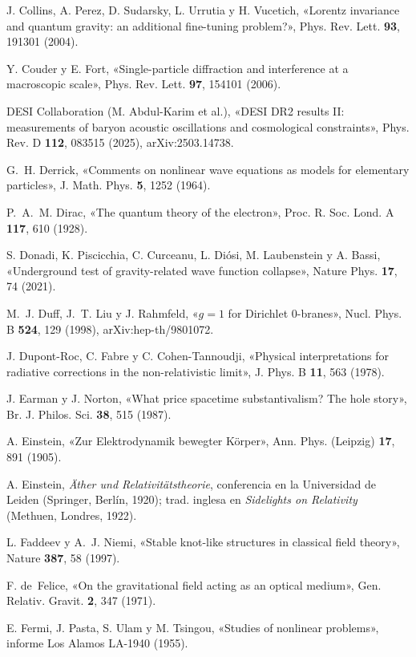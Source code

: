 \documentclass[11pt,a4paper]{article}
\begin{document}
\begin{list}{}{\setlength{\leftmargin}{1.5em}\setlength{\itemindent}{-1.5em}\setlength{\itemsep}{0.15em}\small}
\item J. Collins, A. Perez, D. Sudarsky, L. Urrutia y H. Vucetich, «Lorentz invariance and quantum gravity: an additional fine-tuning problem?», Phys. Rev. Lett. \textbf{93}, 191301 (2004).
\item Y. Couder y E. Fort, «Single-particle diffraction and interference at a macroscopic scale», Phys. Rev. Lett. \textbf{97}, 154101 (2006).
\item DESI Collaboration (M. Abdul-Karim et al.), «DESI DR2 results II: measurements of baryon acoustic oscillations and cosmological constraints», Phys. Rev. D \textbf{112}, 083515 (2025), arXiv:2503.14738.
\item G.~H. Derrick, «Comments on nonlinear wave equations as models for elementary particles», J. Math. Phys. \textbf{5}, 1252 (1964).
\item P.~A.~M. Dirac, «The quantum theory of the electron», Proc. R. Soc. Lond. A \textbf{117}, 610 (1928).
\item S. Donadi, K. Piscicchia, C. Curceanu, L. Diósi, M. Laubenstein y A. Bassi, «Underground test of gravity-related wave function collapse», Nature Phys. \textbf{17}, 74 (2021).
\item M.~J. Duff, J.~T. Liu y J. Rahmfeld, «$g=1$ for Dirichlet 0-branes», Nucl. Phys. B \textbf{524}, 129 (1998), arXiv:hep-th/9801072.
\item J. Dupont-Roc, C. Fabre y C. Cohen-Tannoudji, «Physical interpretations for radiative corrections in the non-relativistic limit», J. Phys. B \textbf{11}, 563 (1978).
\item J. Earman y J. Norton, «What price spacetime substantivalism? The hole story», Br. J. Philos. Sci. \textbf{38}, 515 (1987).
\item A. Einstein, «Zur Elektrodynamik bewegter Körper», Ann. Phys. (Leipzig) \textbf{17}, 891 (1905).
\item A. Einstein, \emph{Äther und Relativitätstheorie}, conferencia en la Universidad de Leiden (Springer, Berlín, 1920); trad. inglesa en \emph{Sidelights on Relativity} (Methuen, Londres, 1922).
\item L. Faddeev y A.~J. Niemi, «Stable knot-like structures in classical field theory», Nature \textbf{387}, 58 (1997).
\item F. de~Felice, «On the gravitational field acting as an optical medium», Gen. Relativ. Gravit. \textbf{2}, 347 (1971).
\item E. Fermi, J. Pasta, S. Ulam y M. Tsingou, «Studies of nonlinear problems», informe Los Alamos LA-1940 (1955).

\end{list}
\end{document}
